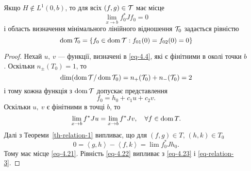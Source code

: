 \begin{lemma}\label{lemma-4.9}
	Якщо $H\notin L^1(0,b)$, то для всіх $(f,g)\in \mathcal{T}$ має місце 
	\begin{equation}\label{eq-4.21}
		\lim_{x\to b} f_0^*Jf_0 = 0
	\end{equation}
	і область визначення мінімального лінійного відношення $\mathcal{T}_0$ задається рівністю
	\begin{equation}\label{eq-4.22}
		\operatorname{dom}{\mathcal{T}_0} = \{ f_0\in \operatorname{dom}{\mathcal{T}}: f_{01}(0) = f_{02}(0)=0 \}
	\end{equation}
\end{lemma}
\begin{proof}
	Нехай $u,\ v$ --- функції, визначені в \eqref{eq-4.4}, які є фінітними в околі точки $b$. Оскільки $n_\pm(T_0)=1$, то
	\begin{equation*}
		\dim (\operatorname{dom}{\mathcal{T}}/\operatorname{dom}{\mathcal{T}_0}) = n_+(\mathcal{T}_0) + n_-(\mathcal{T}_0) = 2 
	\end{equation*}
	і тому кожна функція з $\operatorname{dom}{\mathcal{T}}$ допускає представлення
	\begin{equation}\label{eq-4.23}
		f_0=h_0+c_1u+c_2v.
	\end{equation}
	Оскільки $u,\ v$ є фінітними в точці $b$, то
	\begin{equation}
		\lim_{x\to b} f^*Ju = \lim_{x\to b} f^*Jv, \quad \forall f\in\operatorname{dom}{T}.
	\end{equation}
	Далі з Теореми~\ref{th-relation-1} випливає, що для $(f,g)\in T$, $(h,k)\in T_0$
	\begin{equation*}
		0 = \left< g,h \right> - \left< f,k \right> = \lim f_0^*Jh_0.
	\end{equation*}
	Тому має місце \eqref{eq-4.21}. Рівність \eqref{eq-4.22} випливає з \eqref{eq-4.23} і \eqref{eq-relation-3}.
\end{proof}

